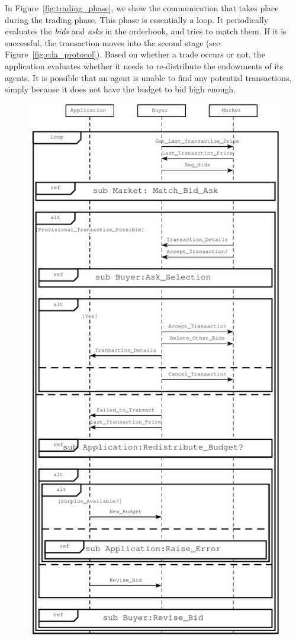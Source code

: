 \documentclass[10pt,journal,compsoc]{IEEEtran}
\begin{document}

In Figure~\ref{fig:trading_phase}, we show the communication that takes place during the trading phase. This phase is essentially a loop. It periodically evaluates the \textit{bids} and \textit{asks} in the orderbook, and tries to match them. If it is successful, the transaction moves into the second stage (see Figure~\ref{fig:cda_protocol}). Based on whether a trade occurs or not, the application evaluates whether it needs to re-distribute the endowments of its agents. It is possible that an agent is unable to find any potential transactions, simply because it does not have the budget to bid high enough.

\begin{figure}[h]
\centering
\includegraphics[scale=0.8]{drawings/trading_phase.pdf}

\end{figure}
\end{document}

